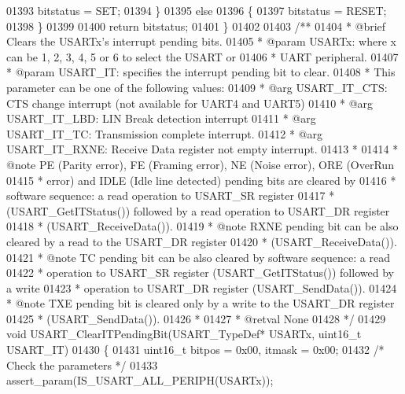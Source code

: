 \begin{DoxyCode}
01393     bitstatus = SET;
01394   \}
01395   \textcolor{keywordflow}{else}
01396   \{
01397     bitstatus = RESET;
01398   \}
01399 
01400   \textcolor{keywordflow}{return} bitstatus;
01401 \}
01402 
01403 \textcolor{comment}{/**}
01404 \textcolor{comment}{  * @brief  Clears the USARTx's interrupt pending bits.}
01405 \textcolor{comment}{  * @param  USARTx: where x can be 1, 2, 3, 4, 5 or 6 to select the USART or }
01406 \textcolor{comment}{  *         UART peripheral.}
01407 \textcolor{comment}{  * @param  USART\_IT: specifies the interrupt pending bit to clear.}
01408 \textcolor{comment}{  *          This parameter can be one of the following values:}
01409 \textcolor{comment}{  *            @arg USART\_IT\_CTS:  CTS change interrupt (not available for UART4 and UART5)}
01410 \textcolor{comment}{  *            @arg USART\_IT\_LBD:  LIN Break detection interrupt}
01411 \textcolor{comment}{  *            @arg USART\_IT\_TC:   Transmission complete interrupt. }
01412 \textcolor{comment}{  *            @arg USART\_IT\_RXNE: Receive Data register not empty interrupt.}
01413 \textcolor{comment}{  *}
01414 \textcolor{comment}{  * @note   PE (Parity error), FE (Framing error), NE (Noise error), ORE (OverRun }
01415 \textcolor{comment}{  *          error) and IDLE (Idle line detected) pending bits are cleared by }
01416 \textcolor{comment}{  *          software sequence: a read operation to USART\_SR register }
01417 \textcolor{comment}{  *          (USART\_GetITStatus()) followed by a read operation to USART\_DR register }
01418 \textcolor{comment}{  *          (USART\_ReceiveData()).}
01419 \textcolor{comment}{  * @note   RXNE pending bit can be also cleared by a read to the USART\_DR register }
01420 \textcolor{comment}{  *          (USART\_ReceiveData()).}
01421 \textcolor{comment}{  * @note   TC pending bit can be also cleared by software sequence: a read }
01422 \textcolor{comment}{  *          operation to USART\_SR register (USART\_GetITStatus()) followed by a write }
01423 \textcolor{comment}{  *          operation to USART\_DR register (USART\_SendData()).}
01424 \textcolor{comment}{  * @note   TXE pending bit is cleared only by a write to the USART\_DR register }
01425 \textcolor{comment}{  *          (USART\_SendData()).}
01426 \textcolor{comment}{  *  }
01427 \textcolor{comment}{  * @retval None}
01428 \textcolor{comment}{  */}
01429 \textcolor{keywordtype}{void} USART_ClearITPendingBit(USART\_TypeDef* USARTx, uint16\_t USART\_IT)
01430 \{
01431   uint16\_t bitpos = 0x00, itmask = 0x00;
01432   \textcolor{comment}{/* Check the parameters */}
01433   assert_param(IS\_USART\_ALL\_PERIPH(USARTx));

\end{DoxyCode}
